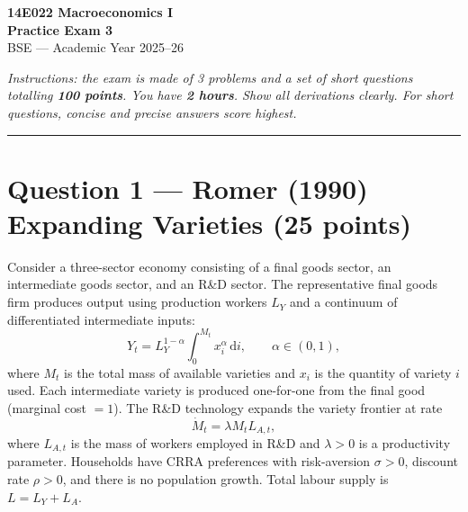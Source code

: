 \documentclass[a4paper,11pt]{article}
\newcommand{\dd}{\mathrm{d}}
\begin{document}

\begin{center}
    {\LARGE \textbf{14E022 Macroeconomics I}}\\[6pt]
    {\Large \textbf{Practice Exam 3}}\\[8pt]
    {\large BSE --- Academic Year 2025--26}
\end{center}

\vspace{8pt}
\noindent\textit{Instructions: the exam is made of 3 problems and a set of short questions totalling \textbf{100 points}.
You have \textbf{2 hours}. Show all derivations clearly. For short questions, concise and precise answers score highest.}
\vspace{4pt}

\noindent\rule{\textwidth}{0.4pt}

\section{Question 1 --- Romer (1990) Expanding Varieties \hfill (25 points)}

Consider a three-sector economy consisting of a final goods sector, an intermediate goods sector,
and an R\&D sector.  The representative final goods firm produces output using production workers
$L_Y$ and a continuum of differentiated intermediate inputs:
\[
    Y_t = L_Y^{1-\alpha} \int_0^{M_t} x_i^{\alpha}\,\dd i,
    \qquad \alpha \in (0,1),
\]
where $M_t$ is the total mass of available varieties and $x_i$ is the quantity of variety $i$
used.  Each intermediate variety is produced one-for-one from the final good (marginal cost
$= 1$).  The R\&D technology expands the variety frontier at rate
\[
    \dot{M}_t = \lambda M_t L_{A,t},
\]
where $L_{A,t}$ is the mass of workers employed in R\&D and $\lambda > 0$ is a productivity
parameter.  Households have CRRA preferences with risk-aversion $\sigma > 0$, discount rate
$\rho > 0$, and there is no population growth.  Total labour supply is $L = L_Y + L_A$.
\end{document}
